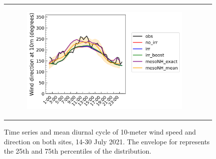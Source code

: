 \begin{figure}[t]
\begin{tabular}{cc}
\begin{subfigure}[t]{0.5\textwidth}
            \includegraphics[width=\textwidth]{images/chap6/SOP_TS_DC/diurnal_cycle_elsplans_wind_direction_10m.png}
        \end{subfigure}
    \end{tabular}
    \caption{Time series and mean diurnal cycle of 10-meter wind speed and direction on both sites, 14-30 July 2021. The envelope for \mesomean represents the 25th and 75th percentiles of the distribution.}
    \label{fig:bothsites_wind}
\end{figure}

\clearpage

